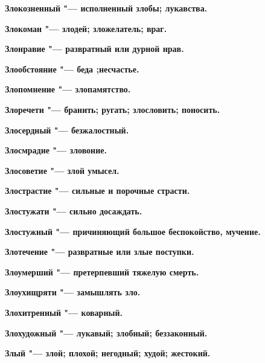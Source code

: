 \bfseries Злокозненный \normalfont{} "--- исполненный злобы; лукавства. 




\bfseries Злокоман \normalfont{} "--- злодей; зложелатель; враг. 




\bfseries Злонравие \normalfont{} "--- развратный или дурной нрав. 




\bfseries Злообстояние \normalfont{} "--- беда ;несчастье. 




\bfseries Злопомнение \normalfont{} "--- злопамятство. 




\bfseries Злоречети \normalfont{} "--- бранить; ругать; злословить; поносить. 




\bfseries Злосердный \normalfont{} "--- безжалостный. 




\bfseries Злосмрадие \normalfont{} "--- зловоние. 




\bfseries Злосоветие \normalfont{} "--- злой умысел. 




\bfseries Злострастие \normalfont{} "--- сильные и порочные страсти. 




\bfseries Злостужати \normalfont{} "--- сильно досаждать. 




\bfseries Злостужный \normalfont{} "--- причиняющий большое беспокойство, мучение. 




\bfseries Злотечение \normalfont{} "--- развратные или злые поступки. 




\bfseries Злоумерший \normalfont{} "--- претерпевший тяжелую смерть. 




\bfseries Злоухищряти \normalfont{} "--- замышлять зло. 




\bfseries Злохитренный \normalfont{} "--- коварный. 




\bfseries Злохудожный \normalfont{} "--- лукавый; злобный; беззаконный. 




\bfseries Злый \normalfont{} "--- злой; плохой; негодный; худой; жестокий. 




